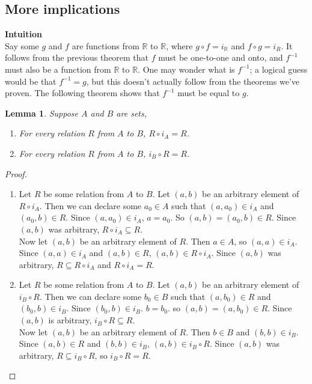 \documentclass{report}
\newtheorem*{lemma}{Lemma}
\theoremstyle{definition}
\begin{document}
\subsection{More implications}
\textbf{Intuition}\\
Say some $g$ and $f$ are functions from $\mathbb R$ to $\mathbb R$, where $g\circ f=i_{\mathbb R}$ and $f\circ g=i_R$. It follows from the previous theorem that $f$ must be one-to-one and onto, and 
$f^{-1}$ must also be a function from $\mathbb R$ to $\mathbb R$. One may wonder what is $f^{-1}$; a logical guess would be that $f^{-1}=g$, but this doesn't actually follow from the theorems we've
proven. The following theorem shows that $f^{-1}$ must be equal to $g$.
\begin{lemma}
Suppose $A$ and $B$ are sets,
\begin{enumerate}
\item For every relation $R$ from $A$ to $B$, $R\circ i_A=R$.
\item For every relation $R$ from $A$ to $B$, $i_B\circ R=R$.
\end{enumerate}
\end{lemma}
\begin{proof}\hspace{1mm}
\begin{enumerate}
\item Let $R$ be some relation from $A$ to $B$. Let $(a,b)$ be an arbitrary element of $R\circ i_A$. Then we can declare some $a_0\in A$ such that $(a,a_0)\in i_A$ and $(a_0,b)\in R$. Since 
$(a,a_0)\in i_A$, $a=a_0$. So $(a,b)=(a_0,b)\in R$. Since $(a,b)$ was arbitrary, $R\circ i_A\subseteq R$.\\
Now let $(a,b)$ be an arbitrary element of $R$. Then $a\in A$, so $(a,a)\in i_A$. Since $(a,a)\in i_A$ and $(a,b)\in R$, $(a,b)\in R\circ i_A$. Since $(a,b)$ was arbitrary,
$R\subseteq R\circ i_A$ and $R\circ i_A=R$.
\item Let $R$ be some relation from $A$ to $B$. Let $(a,b)$ be an arbitrary element of $i_B\circ R$. Then we can declare some $b_0\in B$
such that $(a,b_0)\in R$ and $(b_0,b)\in i_B$. Since $(b_0,b)\in i_B$. $b=b_0$. so $(a,b)=(a,b_0)\in R$. Since $(a,b)$ is arbitrary, $i_B\circ R\subseteq R$.\\
Now let $(a,b)$ be an arbitrary element of $R$. Then $b\in B$ and $(b,b)\in i_B$. Since $(a,b)\in R$ and $(b,b)\in i_B$, $(a,b)\in i_B\circ R$. Since $(a,b)$ was arbitrary, 
$R\subseteq i_B\circ R$, so $i_B\circ R=R$.\qedhere
\end{enumerate}
\end{proof}
\end{document}
